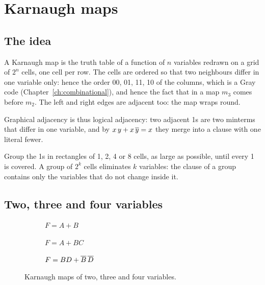 \section{Karnaugh maps}

\subsection{The idea}

A Karnaugh map is the truth table of a function of $n$ variables redrawn on a
grid of $2^{n}$ cells, one cell per row. The cells are ordered so that two
neighbours differ in one variable only: hence the order 00, 01, 11, 10 of the
columns, which is a Gray code (Chapter~\ref{ch:combinational}), and hence the
fact that in a map $m_3$ comes before $m_2$. The left and right edges are
adjacent too: the map wraps round.

Graphical adjacency is thus logical adjacency: two adjacent 1s are two
minterms that differ in one variable, and by $x\,y+x\,\overline{y}=x$ they merge
into a clause with one literal fewer.

\begin{prgconcept}
Group the 1s in rectangles of 1, 2, 4 or 8 cells, as large as possible, until
every 1 is covered. A group of $2^{k}$ cells eliminates $k$ variables: the
clause of a group contains only the variables that do not change inside it.
\end{prgconcept}

\subsection{Two, three and four variables}

\begin{figure}[htb]
\centering
\begin{subfigure}[b]{0.25\textwidth}\centering
{}
\caption{$F=A+B$}\label{fig:b2:k2}
\end{subfigure}\hfill
\begin{subfigure}[b]{0.36\textwidth}\centering
{}
\caption{$F=A+BC$}\label{fig:b2:k3}
\end{subfigure}\hfill
\begin{subfigure}[b]{0.36\textwidth}\centering
{}
\caption{$F=BD+\overline{B}\,\overline{D}$}\label{fig:b2:k4}
\end{subfigure}
\caption{Karnaugh maps of two, three and four variables.}
\label{fig:b2:kmaps}
\end{figure}

